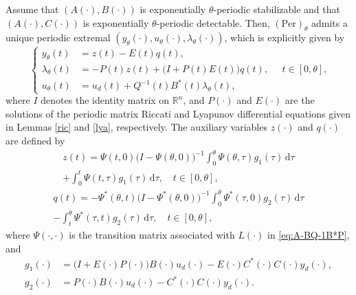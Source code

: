 \documentclass{IEEEtran}
\begin{document}
	\begin{theorem}\label{pee}
		Assume that $(A(\cdot),B(\cdot))$ is exponentially $\theta$-periodic stabilizable and that $(A(\cdot),C(\cdot))$ is exponentially $\theta$-periodic detectable. Then, $(\text{Per})_\theta$ admits a unique periodic extremal $(y_\theta(\cdot),u_\theta(\cdot),\lambda_\theta(\cdot))$, which is explicitly given by 
		\begin{equation}\label{zq}
			\left\{
			\begin{aligned}
				y_\theta(t) &= z(t)-E(t)q(t), \\
				\lambda_\theta(t) &= -P(t)z(t)+\big(I+P(t)E(t)\big)q(t), \\
				u_\theta(t) &= u_d(t)+Q^{-1}(t)B^*(t)\lambda_\theta(t), 
			\end{aligned}
			\right.\quad t\in[0,\theta],
		\end{equation}
		where $I$ denotes the identity matrix on $\mathbb R^n$, and $P(\cdot)$ and $E(\cdot)$ are the solutions of the periodic matrix Riccati and Lyapunov differential equations given in Lemmas \ref{ric} and \ref{lya}, respectively. The auxiliary variables $z(\cdot)$ and $q(\cdot)$ are defined by 
		\begin{multline}\label{tian6}
			z(t) = \Psi(t,0)\big(I-\Psi(\theta,0)\big)^{-1}\int_0^\theta \Psi(\theta,\tau)g_1(\tau)\,\mathrm{d}\tau \\
			+ \int_0^t\Psi(t,\tau)g_1(\tau)\,\mathrm{d}\tau,\quad t \in[0,\theta],
		\end{multline}
		\begin{multline}\label{tian7}
			q(t) = -\Psi^*(\theta,t)\big(I-\Psi^*(\theta,0)\big)^{-1}\int_0^\theta \Psi^*(\tau,0)g_2(\tau)\,\mathrm{d}\tau \\
			- \int_t^\theta\Psi^*(\tau,t)g_2(\tau)\,\mathrm{d}\tau,\quad t \in[0,\theta],
		\end{multline}
		where $\Psi(\cdot,\cdot)$ is the transition matrix associated with $L(\cdot)$ in \eqref{eq:A-BQ-1B*P}, and
		\begin{align*}
			g_1(\cdot) &= \big(I+ E(\cdot) P(\cdot)\big)B(\cdot)u_d(\cdot) - E(\cdot)C^*(\cdot)C(\cdot)y_d(\cdot), \\
			g_2(\cdot) &= P(\cdot)B(\cdot)u_d(\cdot) - C^*(\cdot)C(\cdot)y_d(\cdot).
		\end{align*}
	\end{theorem}
\end{document}
